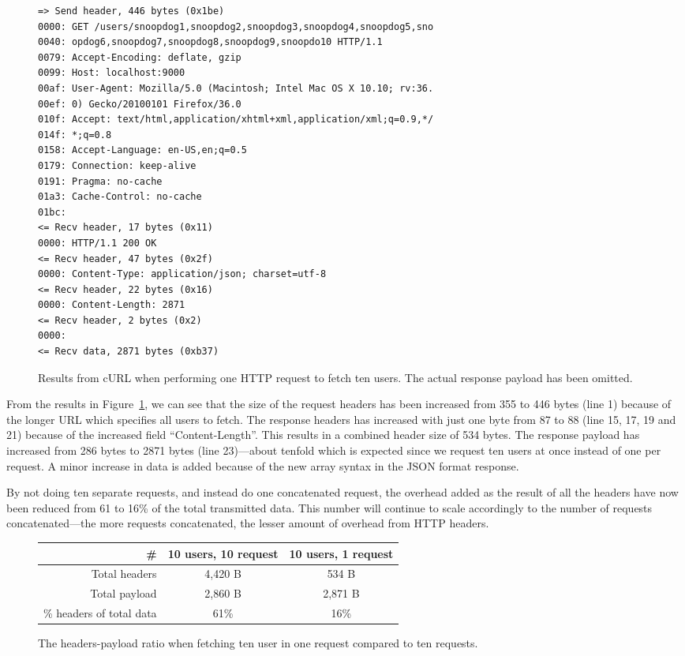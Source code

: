 \documentclass{cslthse-msc}
\begin{document}
\begin{figure}[H]
  \centering
\begin{lstlisting}[breaklines=true]
=> Send header, 446 bytes (0x1be)
0000: GET /users/snoopdog1,snoopdog2,snoopdog3,snoopdog4,snoopdog5,sno
0040: opdog6,snoopdog7,snoopdog8,snoopdog9,snoopdo10 HTTP/1.1
0079: Accept-Encoding: deflate, gzip
0099: Host: localhost:9000
00af: User-Agent: Mozilla/5.0 (Macintosh; Intel Mac OS X 10.10; rv:36.
00ef: 0) Gecko/20100101 Firefox/36.0
010f: Accept: text/html,application/xhtml+xml,application/xml;q=0.9,*/
014f: *;q=0.8
0158: Accept-Language: en-US,en;q=0.5
0179: Connection: keep-alive
0191: Pragma: no-cache
01a3: Cache-Control: no-cache
01bc:
<= Recv header, 17 bytes (0x11)
0000: HTTP/1.1 200 OK
<= Recv header, 47 bytes (0x2f)
0000: Content-Type: application/json; charset=utf-8
<= Recv header, 22 bytes (0x16)
0000: Content-Length: 2871
<= Recv header, 2 bytes (0x2)
0000:
<= Recv data, 2871 bytes (0xb37)
\end{lstlisting}
  \caption{Results from cURL when performing one HTTP request to fetch ten users. The actual response payload has been omitted.}
  \label{fig:headers_overhead2}
\end{figure}

From the results in Figure~\ref{fig:headers_overhead2}, we can see that the size of the request headers has been increased from 355 to 446 bytes (line 1) because of the longer URL which specifies all users to fetch. The response headers has increased with just one byte from 87 to 88 (line 15, 17, 19 and 21) because of the increased field \enquote{Content-Length}. This results in a combined header size of 534 bytes. The response payload has increased from 286 bytes to 2871 bytes (line 23)---about tenfold which is expected since we request ten users at once instead of one per request. A minor increase in data is added because of the new array syntax in the JSON format response.

By not doing ten separate requests, and instead do one concatenated request, the overhead added as the result of all the headers have now been reduced from 61 to 16\% of the total transmitted data. This number will continue to scale accordingly to the number of requests concatenated---the more requests concatenated, the lesser amount of overhead from HTTP headers.

\begin{figure}[H]
  \centering
    \begin{center}
      \begin{tabular}{ r | c | c }
        \textbf{\#} & \textbf{10 users, 10 request} & \textbf{10 users, 1 request} \\ \hline
        Total headers & 4,420 B & 534 B \\ \hline
        Total payload & 2,860 B & 2,871 B \\ \hline
        \% headers of total data & 61\% & 16\% \\ \hline
      \end{tabular}
    \end{center}
  \caption{The headers-payload ratio when fetching ten user in one request compared to ten requests.}
\end{figure}
\end{document}
